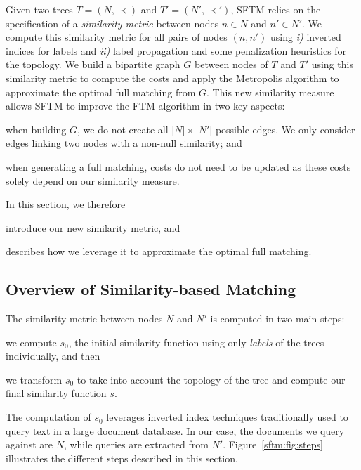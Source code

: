Given two trees $T=(N,\prec)$ and $T'=(N',\prec')$, SFTM relies on the specification of a \textit{similarity metric} between nodes $n \in N$ and $n' \in N'$.
We compute this similarity metric for all pairs of nodes $(n,n')$ using \emph{i)} inverted indices for labels and \emph{ii)} label propagation and some penalization heuristics for the topology.
We build a bipartite graph $G$ between nodes of $T$ and $T'$ using this similarity metric to compute the costs and apply the Metropolis algorithm to approximate the optimal full matching from $G$.
This new similarity measure allows SFTM to improve the FTM algorithm in two key aspects:
\begin{compactenum}
	\item when building $G$, we do not create all $|N|\times|N'|$ possible edges. We only consider edges linking two nodes with a non-null similarity; and
    \item when generating a full matching, costs do not need to be updated as these costs solely depend on our similarity measure.
\end{compactenum}
In this section, we therefore
\begin{inparaenum}[(a)]
	\item introduce our new similarity metric, and
    \item describes how we leverage it to approximate the optimal full matching.
\end{inparaenum}

\subsection{Overview of Similarity-based Matching}\label{se:newCost}
The similarity metric between nodes $N$ and $N'$ is computed in two main steps:
\begin{inparaenum}
	\item we compute $s_0$, the initial similarity function using only \textit{labels} of the trees individually, and then
    \item we transform $s_0$ to take into account the topology of the tree and compute our final similarity function $s$.
\end{inparaenum}
The computation of $s_0$ leverages inverted index techniques traditionally used to query text in a large document database.
In our case, the documents we query against are $N$, while queries are extracted from $N'$.
Figure~\ref{sftm:fig:steps} illustrates the different steps described in this section.

